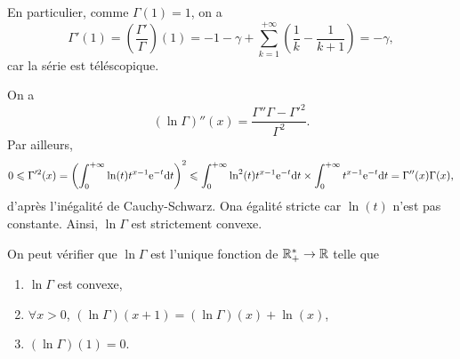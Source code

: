 \documentclass[12pt]{article}
\begin{document}
\begin{remark}
    En particulier, comme $\Gamma(1)=1$, on a 
        \begin{equation}
            \Gamma'(1)=\left(\frac{\Gamma'}{\Gamma}\right)(1)=-1-\gamma+\sum_{k=1}^{+\infty}\left(\frac{1}{k}-\frac{1}{k+1}\right)=-\gamma,
        \end{equation}
    car la série est téléscopique.
\end{remark}

\begin{remark}
    On a 
    \begin{equation}
        \left(\ln\Gamma\right)''(x)=\frac{\Gamma''\Gamma-\Gamma'^{2}}{\Gamma^{2}}.
    \end{equation}
    Par ailleurs,
    \begin{equation}
        0\leqslant\Gamma'^{2}(x)=\left(\int_{0}^{+\infty}\ln(t)t^{x-1}\mathrm{e}^{-t}\mathrm{d} t\right)^{2}\leqslant\int_{0}^{+\infty}\ln^{2}(t)t^{x-1}\mathrm{e}^{-t}\mathrm{d} t\times\int_{0}^{+\infty}t^{x-1}\mathrm{e}^{-t}\mathrm{d} t=\Gamma''(x)\Gamma(x),
    \end{equation}
    d'après l'inégalité de Cauchy-Schwarz. Ona égalité stricte car $\ln(t)$ n'est pas constante. Ainsi, $\ln\Gamma$ est strictement convexe.
\end{remark}

\begin{remark}
    On peut vérifier que $\ln\Gamma$ est l'unique fonction de $\mathbb{R}_{+}^{*}\to\mathbb{R}$ telle que 
    \begin{enumerate}
        \item $\ln\Gamma$ est convexe,
        \item $\forall x>0$, $\left(\ln\Gamma\right)(x+1)=\left(\ln\Gamma\right)(x)+\ln(x)$,
        \item $\left(\ln\Gamma\right)(1)=0$.
    \end{enumerate}
\end{remark}
\end{document}
